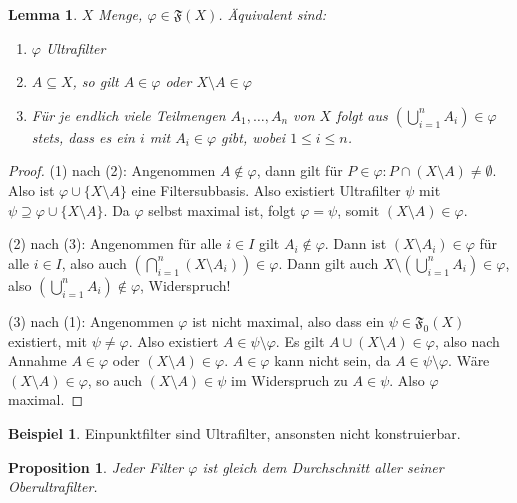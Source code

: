 \documentclass[12pt]{scrartcl}%
\newtheorem{prop}{Proposition}
\newtheorem{lemma}{Lemma}
\theoremstyle{definition}
\newtheorem{ex}{Beispiel}
\theoremstyle{remark}
\newcommand{\filterset}{\mathfrak{F}}
\begin{document}
\begin{lemma}
    $X$ Menge, $\varphi\in \filterset(X)$. Äquivalent sind:

    \begin{enumerate}[label=(\arabic*)]
        \item $\varphi$ Ultrafilter
        \item $A\subseteq X$, so gilt $A\in\varphi$ oder $X\setminus A\in\varphi$
        \item Für je endlich viele Teilmengen $A_1,\dots,A_n$ von $X$ folgt aus $\left(\bigcup_{i=1}^n A_i \right) \in\varphi$ stets, dass es ein $i$ mit $A_i\in\varphi$ gibt, wobei $1\leq i\leq n$.
    \end{enumerate}
\end{lemma}

\begin{proof}
    (1) nach (2): Angenommen $A\not\in \varphi$, dann gilt für $P\in\varphi: P\cap (X\setminus A) \neq \emptyset$. Also ist $\varphi \cup \{X\setminus A\}$ eine Filtersubbasis. Also existiert Ultrafilter $\psi$ mit $\psi \supseteq \varphi \cup \{X\setminus A\}$. Da $\varphi$ selbst maximal ist, folgt $\varphi=\psi$, somit $(X\setminus A)\in\varphi$.

    (2) nach (3): Angenommen für alle $i\in I$ gilt $A_i\not\in\varphi$. Dann ist $(X\setminus A_i)\in\varphi$ für alle $i\in I$, also auch $\left(\bigcap_{i=1}^n (X\setminus A_i)\right) \in \varphi$. Dann gilt auch $X\setminus \left( \bigcup_{i=1}^n A_i \right) \in \varphi$, also $\left( \bigcup_{i=1}^n A_i \right) \not\in \varphi$, Widerspruch!

    (3) nach (1): Angenommen $\varphi$ ist nicht maximal, also dass ein $\psi\in\filterset_0(X)$ existiert, mit $\psi \neq \varphi$. Also existiert $A\in \psi\setminus \varphi$. Es gilt $A \cup (X\setminus A) \in \varphi$, also nach Annahme $A\in\varphi$ oder $(X\setminus A) \in \varphi$. $A\in\varphi$ kann nicht sein, da $A\in\psi\setminus\varphi$. Wäre $(X\setminus A) \in\varphi$, so auch $(X\setminus A)\in \psi$ im Widerspruch zu $A\in\psi$. Also $\varphi$ maximal.
\end{proof}

\begin{ex}
    Einpunktfilter sind Ultrafilter, ansonsten nicht konstruierbar.
\end{ex}

\begin{prop}
    Jeder Filter $\varphi$ ist gleich dem Durchschnitt aller seiner Oberultrafilter.
\end{prop}
\end{document}

